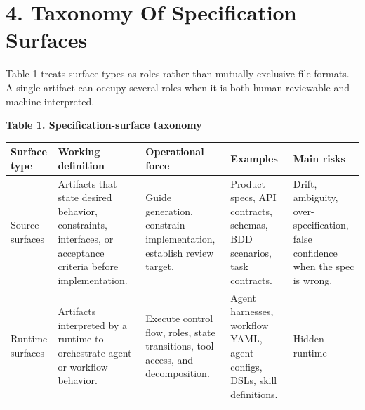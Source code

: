 \documentclass[
]{article}
\begin{document}
\section{4. Taxonomy Of Specification
Surfaces}\label{taxonomy-of-specification-surfaces}

Table 1 treats surface types as roles rather than mutually exclusive
file formats. A single artifact can occupy several roles when it is both
human-reviewable and machine-interpreted.

\textbf{Table 1. Specification-surface taxonomy}

\begin{longtable}[]{@{}
  >{\raggedright\arraybackslash}p{}
  >{\raggedright\arraybackslash}p{}
  >{\raggedright\arraybackslash}p{}
  >{\raggedright\arraybackslash}p{}
  >{\raggedright\arraybackslash}p{}@{}}
\toprule\noalign{}
\begin{minipage}[b]{\linewidth}\raggedright
Surface type
\end{minipage} & \begin{minipage}[b]{\linewidth}\raggedright
Working definition
\end{minipage} & \begin{minipage}[b]{\linewidth}\raggedright
Operational force
\end{minipage} & \begin{minipage}[b]{\linewidth}\raggedright
Examples
\end{minipage} & \begin{minipage}[b]{\linewidth}\raggedright
Main risks
\end{minipage} \\
\midrule\noalign{}
\endhead
\bottomrule\noalign{}
\endlastfoot
Source surfaces & Artifacts that state desired behavior, constraints,
interfaces, or acceptance criteria before implementation. & Guide
generation, constrain implementation, establish review target. & Product
specs, API contracts, schemas, BDD scenarios, task contracts. & Drift,
ambiguity, over-specification, false confidence when the spec is
wrong. \\
Runtime surfaces & Artifacts interpreted by a runtime to orchestrate
agent or workflow behavior. & Execute control flow, roles, state
transitions, tool access, and decomposition. & Agent harnesses, workflow
YAML, agent configs, DSLs, skill definitions. & Hidden runtime

\end{longtable}
\end{document}

